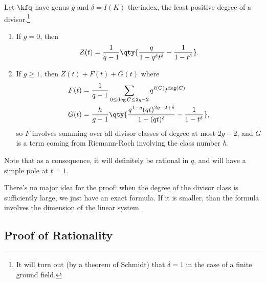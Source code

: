 \begin{proposition}

Let \(\kfq\) have genus \(g\) and \(\delta = I(K)\) the index, the least
positive degree of a divisor.\footnote{It will turn out (by a theorem of
  Schmidt) that \(\delta = 1\) in the case of a finite ground field.}

\begin{enumerate}
\def\labelenumi{\alph{enumi}.}
\item
  If \(g=0\), then
  \begin{align*}  
  Z(t) = {1\over q-1} \qty{{q \over 1-q^\delta t^\delta} - {1 \over 1-t^\delta}}
  .\end{align*}
\item
  If \(g\geq 1\), then \(Z(t) + F(t) + G(t)\) where
  \begin{align*}  
  F(t) 
  &= {1\over q-1} \sum_{0\leq \deg C \leq 2g-2} q^{\ell(C)} t^{\deg(C)} \\
  G(t)
  &= {h \over g-1} \qty{
  { q^{1-g} (qt)^{2g-2+\delta} \over 1 - (qt)^\delta } - {1 \over 1 - t^\delta}
  }
  ,\end{align*} so \(F\) involves summing over all divisor classes of
  degree at most \(2g-2\), and \(G\) is a term coming from Riemann-Roch
  involving the class number \(h\).
\end{enumerate}

\end{proposition}

Note that as a consequence, it will definitely be rational in \(q\), and
will have a simple pole at \(t=1\).

There's no major idea for the proof: when the degree of the divisor
class is sufficiently large, we just have an exact formula. If it is
smaller, than the formula involves the dimension of the linear system.

\hypertarget{proof-of-rationality}{%
\subsection{Proof of Rationality}\label{proof-of-rationality}}

